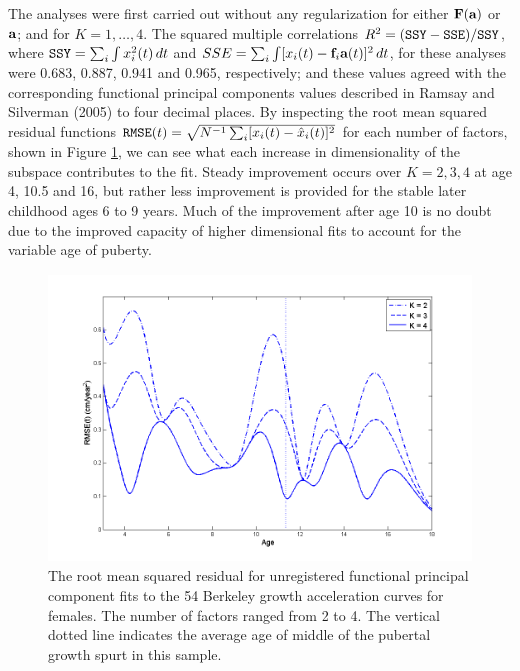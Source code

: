 \documentclass[12pt]{article}
\begin{document}
The analyses were first carried out without any regularization for either $\mbox{\bf F}(\mbox{\bf a})$ or $\mbox{\bf a}$; and for $K = 1, \ldots, 4.$  The squared multiple correlations $R^2 = (\mbox{\tt SSY} - \mbox{\tt SSE})/\mbox{\tt SSY}$, where $\mbox{\tt SSY} = \sum_i \int x_i^2(t) \, dt$ and $SSE = \sum_i \int [x_i(t) - \mbox{\bf f}_i \mbox{\bf a}(t)]^2 \, dt$, for these analyses were 0.683, 0.887, 0.941 and 0.965, respectively; and these values agreed with the corresponding functional principal components values described in Ramsay and Silverman (2005) to four decimal places.  By inspecting the root mean squared residual functions $\mbox{\tt RMSE}(t) = \sqrt{N^{-1} \sum_i [x_i(t) - \hat{x}_i(t)]^2}$ for each number of factors, shown in Figure \ref{RMSE_FDA}, we can see what each increase in dimensionality of the subspace contributes to the fit.  Steady improvement occurs over $K = 2,3,4$ at age 4, 10.5 and 16, but rather less improvement is provided for the stable later childhood ages 6 to 9 years.  Much of the improvement after age 10 is no doubt due to the improved capacity of higher dimensional fits to account for the variable age of puberty.

\begin{figure}
  \includegraphics[height=3in, width=5in]{figs/RMSE_FDA}
  \caption{The root mean squared residual for unregistered functional principal component fits to the 54 Berkeley growth acceleration curves for females.  The number of factors ranged from 2 to 4.  The vertical dotted line indicates the average age of middle of the pubertal growth spurt in this sample.}
  \label{RMSE_FDA}
\end{figure}
\end{document}
